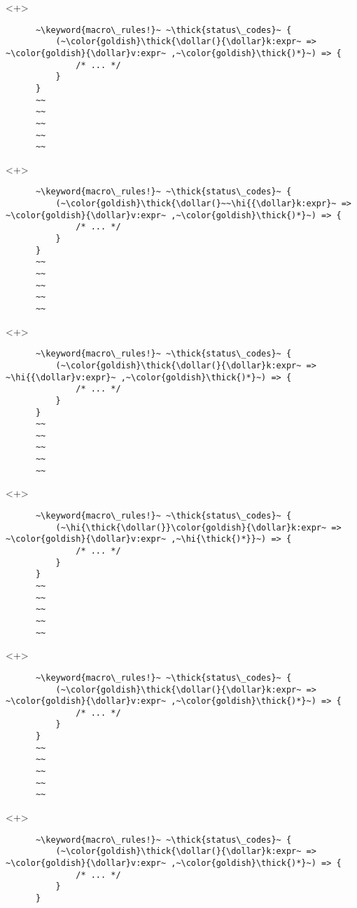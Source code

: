 \documentclass[usepdftitle=false]{beamer}
\newcommand{\dollar}{\makebox[\widthof{\$}][c]{\$}}
\newcommand{\thick}[1]{\contourlength{0.16pt}\contour[10]{black}{#1}}
\newcommand{\hi}[1]{%
\tikz[baseline=(A.base)]
 \node[highlighting=yellowbg,inner sep=0pt,text depth=0pt] (A) {#1};%
}
\newcommand{\keyword}[1]{\color{greenish}#1}
\begin{document}
\begin{frame}[fragile]
  \begin{onlyenv}<+>
    \begin{verbatim}
      ~\keyword{macro\_rules!}~ ~\thick{status\_codes}~ {
          (~\color{goldish}\thick{\dollar(}{\dollar}k:expr~ => ~\color{goldish}{\dollar}v:expr~ ,~\color{goldish}\thick{)*}~) => {
              /* ... */
          }
      }
      ~~
      ~~
      ~~
      ~~
      ~~
    \end{verbatim}
  \end{onlyenv}
  \begin{onlyenv}<+>
    \begin{verbatim}
      ~\keyword{macro\_rules!}~ ~\thick{status\_codes}~ {
          (~\color{goldish}\thick{\dollar(}~~\hi{{\dollar}k:expr}~ => ~\color{goldish}{\dollar}v:expr~ ,~\color{goldish}\thick{)*}~) => {
              /* ... */
          }
      }
      ~~
      ~~
      ~~
      ~~
      ~~
    \end{verbatim}
  \end{onlyenv}
  \begin{onlyenv}<+>
    \begin{verbatim}
      ~\keyword{macro\_rules!}~ ~\thick{status\_codes}~ {
          (~\color{goldish}\thick{\dollar(}{\dollar}k:expr~ => ~\hi{{\dollar}v:expr}~ ,~\color{goldish}\thick{)*}~) => {
              /* ... */
          }
      }
      ~~
      ~~
      ~~
      ~~
      ~~
    \end{verbatim}
  \end{onlyenv}
  \begin{onlyenv}<+>
    \begin{verbatim}
      ~\keyword{macro\_rules!}~ ~\thick{status\_codes}~ {
          (~\hi{\thick{\dollar(}}\color{goldish}{\dollar}k:expr~ => ~\color{goldish}{\dollar}v:expr~ ,~\hi{\thick{)*}}~) => {
              /* ... */
          }
      }
      ~~
      ~~
      ~~
      ~~
      ~~
    \end{verbatim}
  \end{onlyenv}
  \begin{onlyenv}<+>
    \begin{verbatim}
      ~\keyword{macro\_rules!}~ ~\thick{status\_codes}~ {
          (~\color{goldish}\thick{\dollar(}{\dollar}k:expr~ => ~\color{goldish}{\dollar}v:expr~ ,~\color{goldish}\thick{)*}~) => {
              /* ... */
          }
      }
      ~~
      ~~
      ~~
      ~~
      ~~
    \end{verbatim}
  \end{onlyenv}
  \begin{onlyenv}<+>
    \begin{verbatim}
      ~\keyword{macro\_rules!}~ ~\thick{status\_codes}~ {
          (~\color{goldish}\thick{\dollar(}{\dollar}k:expr~ => ~\color{goldish}{\dollar}v:expr~ ,~\color{goldish}\thick{)*}~) => {
              /* ... */
          }
      }


\end{verbatim}
\end{onlyenv}
\end{frame}
\end{document}
